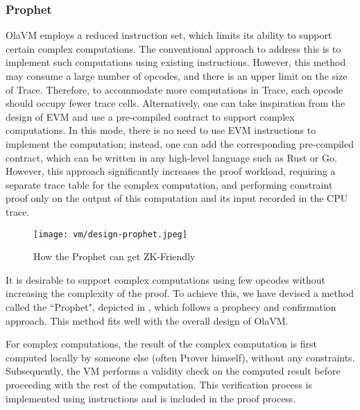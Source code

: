 \subsubsection{Prophet} \label{sec:design-prophet}

OlaVM employs a reduced instruction set, which limits its ability to support certain complex computations. The conventional approach to address this is to implement such computations using existing instructions. 
However, this method may consume a large number of opcodes, and there is an upper limit on the size of Trace. 
Therefore, to accommodate more computations in Trace, each opcode should occupy fewer trace cells. Alternatively, one can take inspiration from the design of EVM and use a pre-compiled contract to support complex computations. 
In this mode, there is no need to use EVM instructions to implement the computation; instead, one can add the corresponding pre-compiled contract, which can be written in any high-level language such as Rust or Go. 
However, this approach significantly increases the proof workload, requiring a separate trace table for the complex computation, and performing constraint proof only on the output of this computation and its input recorded in the CPU trace.

\begin{figure}[!ht]
    \centering
    \texttt{[image: vm/design-prophet.jpeg]}
    \caption{How the Prophet can get ZK-Friendly}
    \label{fig:design-prophet}
\end{figure}

It is desirable to support complex computations using few opcodes without increasing the complexity of the proof. 
To achieve this, we have devised a method called the ``Prophet", depicted in , 
which follows a prophecy and confirmation approach. This method fits well with the overall design of OlaVM.

For complex computations, the result of the complex computation is first computed locally by someone else (often Prover himself), without any constraints. 
Subsequently, the VM performs a validity check on the computed result before proceeding with the rest of the computation. 
This verification process is implemented using instructions and is included in the proof process.

